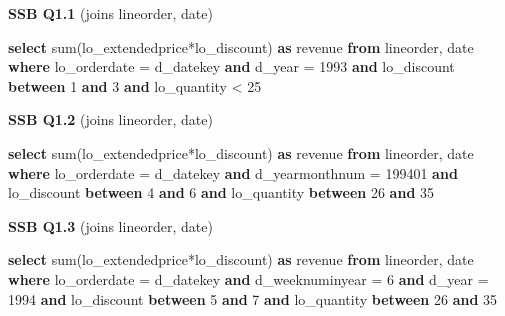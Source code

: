 \documentclass[
  10pt,
]{article}
\newenvironment{Shaded}{}{}
\newcommand{\DataTypeTok}[1]{\textcolor[rgb]{0.56,0.13,0.00}{#1}}
\newcommand{\DecValTok}[1]{\textcolor[rgb]{0.25,0.63,0.44}{#1}}
\newcommand{\FunctionTok}[1]{\textcolor[rgb]{0.02,0.16,0.49}{#1}}
\newcommand{\KeywordTok}[1]{\textcolor[rgb]{0.00,0.44,0.13}{\textbf{#1}}}
\newcommand{\NormalTok}[1]{#1}
\newcommand{\OperatorTok}[1]{\textcolor[rgb]{0.40,0.40,0.40}{#1}}
\begin{document}
\textbf{SSB Q1.1} (joins lineorder, date)

\begin{Shaded}
\begin{Highlighting}[]
\KeywordTok{select} \FunctionTok{sum}\NormalTok{(lo\_extendedprice}\OperatorTok{*}\NormalTok{lo\_discount) }\KeywordTok{as}\NormalTok{ revenue}
\KeywordTok{from}\NormalTok{ lineorder, }\DataTypeTok{date}
\KeywordTok{where}\NormalTok{ lo\_orderdate }\OperatorTok{=}\NormalTok{ d\_datekey }\KeywordTok{and}\NormalTok{ d\_year }\OperatorTok{=} \DecValTok{1993} \KeywordTok{and}\NormalTok{ lo\_discount }\KeywordTok{between} \DecValTok{1} \KeywordTok{and} \DecValTok{3} \KeywordTok{and}\NormalTok{ lo\_quantity }\OperatorTok{\textless{}} \DecValTok{25}
\end{Highlighting}
\end{Shaded}

\textbf{SSB Q1.2} (joins lineorder, date)

\begin{Shaded}
\begin{Highlighting}[]
\KeywordTok{select} \FunctionTok{sum}\NormalTok{(lo\_extendedprice}\OperatorTok{*}\NormalTok{lo\_discount) }\KeywordTok{as}\NormalTok{ revenue}
\KeywordTok{from}\NormalTok{ lineorder, }\DataTypeTok{date}
\KeywordTok{where}\NormalTok{ lo\_orderdate }\OperatorTok{=}\NormalTok{ d\_datekey }\KeywordTok{and}\NormalTok{ d\_yearmonthnum }\OperatorTok{=} \DecValTok{199401} \KeywordTok{and}\NormalTok{ lo\_discount }\KeywordTok{between} \DecValTok{4} \KeywordTok{and} \DecValTok{6} \KeywordTok{and}\NormalTok{ lo\_quantity }\KeywordTok{between} \DecValTok{26} \KeywordTok{and} \DecValTok{35}
\end{Highlighting}
\end{Shaded}

\textbf{SSB Q1.3} (joins lineorder, date)

\begin{Shaded}
\begin{Highlighting}[]
\KeywordTok{select} \FunctionTok{sum}\NormalTok{(lo\_extendedprice}\OperatorTok{*}\NormalTok{lo\_discount) }\KeywordTok{as}\NormalTok{ revenue}
\KeywordTok{from}\NormalTok{ lineorder, }\DataTypeTok{date}
\KeywordTok{where}\NormalTok{ lo\_orderdate }\OperatorTok{=}\NormalTok{ d\_datekey }\KeywordTok{and}\NormalTok{ d\_weeknuminyear }\OperatorTok{=} \DecValTok{6} \KeywordTok{and}\NormalTok{ d\_year }\OperatorTok{=} \DecValTok{1994} \KeywordTok{and}\NormalTok{ lo\_discount }\KeywordTok{between} \DecValTok{5} \KeywordTok{and} \DecValTok{7} \KeywordTok{and}\NormalTok{ lo\_quantity }\KeywordTok{between} \DecValTok{26} \KeywordTok{and} \DecValTok{35}
\end{Highlighting}
\end{Shaded}
\end{document}
